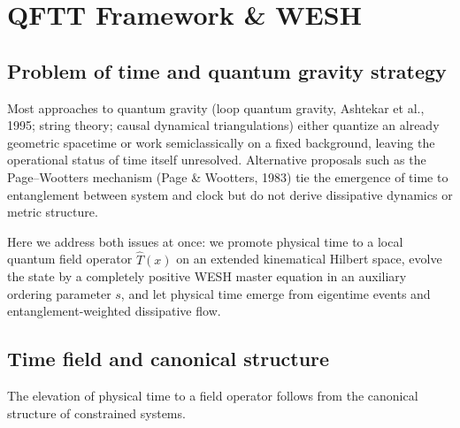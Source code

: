 \documentclass[12pt,a4paper]{article}
\numberwithin{equation}{section}
\begin{document}
\clearpage

\section{QFTT Framework \& WESH}
\label{sec:qftt-framework}

\subsection{Problem of time and quantum gravity strategy}
\vspace{0.3cm}

Most approaches to quantum gravity (loop quantum gravity, Ashtekar et al., 1995; string
theory; causal dynamical triangulations) either quantize an already
geometric spacetime or work semiclassically on a fixed background, leaving
the operational status of time itself unresolved. Alternative proposals such
as the Page--Wootters mechanism (Page \& Wootters, 1983) tie the emergence
of time to entanglement between system and clock but do not derive
dissipative dynamics or metric structure. 

\noindent Here we address both issues at once: we promote physical time to a local
quantum field operator $\hat T(x)$ on an extended kinematical Hilbert space, evolve
the state by a completely positive WESH master equation in an auxiliary
ordering parameter $s$, and let physical time emerge
from eigentime events and entanglement-weighted dissipative flow.


\subsection{Time field and canonical structure}

The elevation of physical time to a field operator follows from the
canonical structure of constrained systems.
\end{document}
